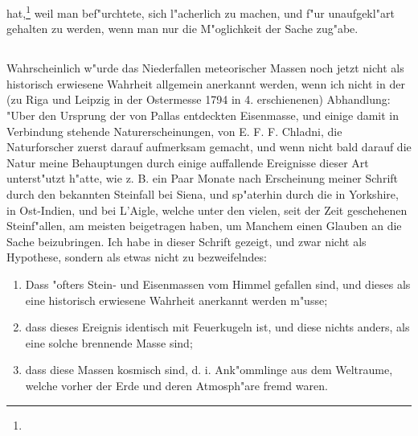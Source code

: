 \documentclass[a4paper, 11pt, oneside, polutonikogreek, german]{article}
\begin{document}
hat,\footnote{} weil man bef"urchtete, sich l"acherlich zu machen, und f"ur unaufgekl"art gehalten zu werden, wenn man nur die M"oglichkeit der Sache zug"abe.
\subsection{}
\paragraph{}
Wahrscheinlich w"urde das Niederfallen meteorischer Massen noch jetzt nicht als historisch erwiesene Wahrheit allgemein anerkannt werden, wenn ich nicht in der (zu Riga und Leipzig in der Ostermesse 1794 in 4. erschienenen) Abhandlung: "Uber den Ursprung der von Pallas entdeckten Eisenmasse, und einige damit in Verbindung stehende Naturerscheinungen, von E. F. F. Chladni, die Naturforscher zuerst darauf aufmerksam gemacht, und wenn nicht bald darauf die Natur meine Behauptungen durch einige auffallende Ereignisse dieser Art unterst"utzt h"atte, wie z. B. ein Paar Monate nach Erscheinung meiner Schrift durch den bekannten Steinfall bei Siena, und sp"aterhin durch die in Yorkshire, in Ost-Indien, und bei L'Aigle, welche unter den vielen, seit der Zeit geschehenen Steinf"allen, am meisten beigetragen haben, um Manchem einen Glauben an die Sache beizubringen. Ich habe in dieser Schrift gezeigt, und zwar nicht als Hypothese, sondern als etwas nicht zu bezweifelndes:
\begin{enumerate}
    \item Dass "ofters Stein- und Eisenmassen vom Himmel gefallen sind, und dieses als eine historisch erwiesene Wahrheit anerkannt werden m"usse;
    \item dass dieses Ereignis identisch mit Feuerkugeln ist, und diese nichts anders, als eine solche brennende Masse sind;
    \item dass diese Massen kosmisch sind, d. i. Ank"ommlinge aus dem Weltraume, welche vorher der Erde und deren Atmosph"are fremd waren.
\end{enumerate}
\end{document}
